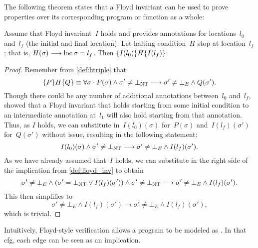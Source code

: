 The following theorem states that a Floyd invariant
can be used to prove properties over its corresponding program or function
as a whole:
\begin{theorem}\label{thm:floyd_hoare}
  Assume that Floyd invariant~$I$ holds and provides annotations for locations~$l_0$ and~$l_f$ (the initial and final location).
  Let halting condition~$H$ stop at location~$l_f$;%
  that is, $H(\sigma)\longrightarrow\operatorname{loc}\sigma=l_f$.
  Then $\{I(l_0)\}H\{I(l_f)\}$.
\end{theorem}
\begin{proof}
  Remember from \cref{def:htriple} that
  \begin{equation*}
    \{P\}H\{Q\}\equiv\forall\sigma\cdot
    P(\sigma)\wedge\sigma'\neq\bot_\mathrm{NT}\longrightarrow
    \sigma'\neq\bot_E\wedge Q(\sigma').
  \end{equation*}
  Though there could be any number of additional annotations between~$l_0$
  and~$l_f$, \textcite{floyd1967assigning} showed that a Floyd invariant that holds
  starting from some initial condition to an intermediate annotation at~$l_1$
  will also hold starting from that annotation.
  Thus, as $I$ holds, we can substitute in~$I(l_0)(\sigma)$ for~$P(\sigma)$
  and~$I(l_f)(\sigma')$ for~$Q(\sigma')$ without issue,
  resulting in the following statement:
  \begin{equation*}
      I(l_0)(\sigma)\wedge\sigma'\neq\bot_\mathrm{NT}\longrightarrow
      \sigma'\neq\bot_E\wedge I(l_f)(\sigma').
  \end{equation*}
  As we have already assumed that~$I$ holds,
  we can substitute in the right side of the implication from \cref{def:floyd_inv}
  to obtain
  \begin{equation*}
    \sigma'\neq\bot_E\wedge(\sigma'=\bot_\mathrm{NT}\vee I(l_f)(\sigma'))\wedge
    \sigma'\neq\bot_\mathrm{NT}\longrightarrow
    \sigma'\neq\bot_E\wedge I(l_f)(\sigma').
  \end{equation*}
  This then simplifies to
  \begin{equation*}
    \sigma'\neq\bot_E\wedge I(l_f)(\sigma')\longrightarrow
    \sigma'\neq\bot_E\wedge I(l_f)(\sigma'),
  \end{equation*}
  which is trivial.
\end{proof}

Intuitively, Floyd-style verification allows a program to be modeled as .%
In that \ac{cfg}, each edge can be seen as an implication.

